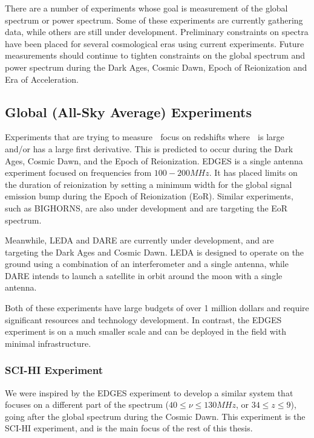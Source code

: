 There are a number of experiments whose goal is measurement of the \cm global spectrum or \cm power spectrum. Some of these experiments are currently gathering data, while others are still under development. Preliminary constraints on \cm spectra have been placed for several cosmological eras using current experiments. Future measurements should continue to tighten constraints on the \cm global spectrum and \cm power spectrum during the Dark Ages, Cosmic Dawn, Epoch of Reionization and Era of Acceleration. 


\subsection{Global (All-Sky Average) Experiments}

Experiments that are trying to measure \avgdtb$\;$ focus on redshifts where \avgdtb$\;$ is large and/or has a large first derivative. This is predicted to occur during the Dark Ages, Cosmic Dawn, and the Epoch of Reionization. EDGES \cite{bowman_2008} is a single antenna experiment focused on frequencies from $100-200 MHz$. It has placed limits on the duration of reionization by setting a minimum width for the \cm global signal emission bump during the Epoch of Reionization (EoR). Similar experiments, such as BIGHORNS\cite{bighorns}\cite{sokolowski_2015}, are also under development and are targeting the EoR spectrum.  

Meanwhile, LEDA \cite{leda}\cite{bernardi_2014} and DARE \cite{burns_2011} are currently under development, and are targeting the Dark Ages and Cosmic Dawn. LEDA is designed to operate on the ground using a combination of an interferometer and a single antenna, while DARE intends to launch a satellite in orbit around the moon with a single antenna. 

Both of these experiments have large budgets of over 1 million dollars and require significant resources and technology development. In contrast, the EDGES experiment is on a much smaller scale and can be deployed in the field with minimal infrastructure.

\subsubsection{SCI-HI Experiment}

We were inspired by the EDGES experiment to develop a similar system that focuses on a different part of the \cm spectrum ($40 \leq \nu \leq 130 MHz$, or $34 \leq z \leq 9$), going after the global spectrum during the Cosmic Dawn. This experiment is the SCI-HI experiment, and is the main focus of the rest of this thesis. 


